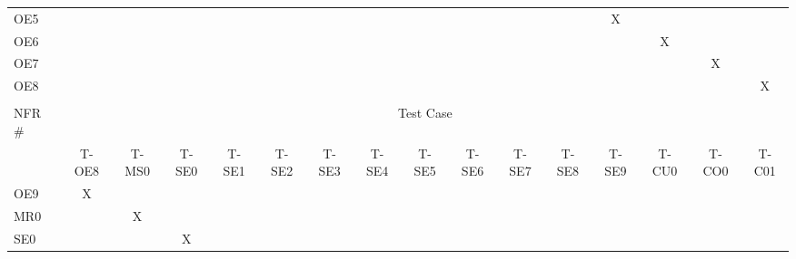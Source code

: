\documentclass[12pt, titlepage]{article}
\begin{document}
\begin{longtable}{llllllllllllllll}
\multicolumn{1}{l|}{OE5} &  &  &  &  &  &  &  &  & \multicolumn{1}{c}{} & \multicolumn{1}{c}{} & \multicolumn{1}{c}{} & \multicolumn{1}{c}{X} & \multicolumn{1}{c}{} & \multicolumn{1}{c}{} & \multicolumn{1}{c}{} \\
\multicolumn{1}{l|}{OE6} &  &  &  &  &  &  &  &  & \multicolumn{1}{c}{} & \multicolumn{1}{c}{} & \multicolumn{1}{c}{} & \multicolumn{1}{c}{} & \multicolumn{1}{c}{X} & \multicolumn{1}{c}{} & \multicolumn{1}{c}{} \\
\multicolumn{1}{l|}{OE7} &  &  &  &  &  &  &  &  &  &  &  &  &  & \multicolumn{1}{c}{X} & \multicolumn{1}{c}{} \\
\multicolumn{1}{l|}{OE8} &  &  &  &  &  &  &  &  &  &  &  &  &  &  & \multicolumn{1}{c}{X} \\
 &  &  &  &  &  &  &  &  &  &  &  &  &  &  &  \\
\multicolumn{1}{l|}{NFR \#} & \multicolumn{15}{c}{Test Case} \\ \hline
\multicolumn{1}{l|}{} & \multicolumn{1}{c}{T-OE8} & \multicolumn{1}{c}{T-MS0} & \multicolumn{1}{c}{T-SE0} & \multicolumn{1}{c}{T-SE1} & \multicolumn{1}{c}{T-SE2} & \multicolumn{1}{c}{T-SE3} & \multicolumn{1}{c}{T-SE4} & \multicolumn{1}{c}{T-SE5} & \multicolumn{1}{c}{T-SE6} & \multicolumn{1}{c}{T-SE7} & \multicolumn{1}{c}{T-SE8} & \multicolumn{1}{c}{T-SE9} & \multicolumn{1}{c}{T-CU0} & \multicolumn{1}{c}{T-CO0} & \multicolumn{1}{c}{T-C01} \\
\multicolumn{1}{l|}{OE9} & \multicolumn{1}{c}{X} & \multicolumn{1}{c}{} & \multicolumn{1}{c}{} & \multicolumn{1}{c}{} & \multicolumn{1}{c}{} & \multicolumn{1}{c}{} & \multicolumn{1}{c}{} & \multicolumn{1}{c}{} & \multicolumn{1}{c}{} & \multicolumn{1}{c}{} & \multicolumn{1}{c}{} & \multicolumn{1}{c}{} & \multicolumn{1}{c}{} & \multicolumn{1}{c}{} & \multicolumn{1}{c}{} \\
\multicolumn{1}{l|}{MR0} & \multicolumn{1}{c}{} & \multicolumn{1}{c}{X} & \multicolumn{1}{c}{} & \multicolumn{1}{c}{} & \multicolumn{1}{c}{} & \multicolumn{1}{c}{} & \multicolumn{1}{c}{} & \multicolumn{1}{c}{} & \multicolumn{1}{c}{} & \multicolumn{1}{c}{} & \multicolumn{1}{c}{} & \multicolumn{1}{c}{} & \multicolumn{1}{c}{} & \multicolumn{1}{c}{} & \multicolumn{1}{c}{} \\
\multicolumn{1}{l|}{SE0} & \multicolumn{1}{c}{} & \multicolumn{1}{c}{} & \multicolumn{1}{c}{X} & \multicolumn{1}{c}{} & \multicolumn{1}{c}{} & \multicolumn{1}{c}{} & \multicolumn{1}{c}{} & \multicolumn{1}{c}{} & \multicolumn{1}{c}{} & \multicolumn{1}{c}{} & \multicolumn{1}{c}{} & \multicolumn{1}{c}{} & \multicolumn{1}{c}{} & \multicolumn{1}{c}{} & \multicolumn{1}{c}{} \\

\end{longtable}
\end{document}
